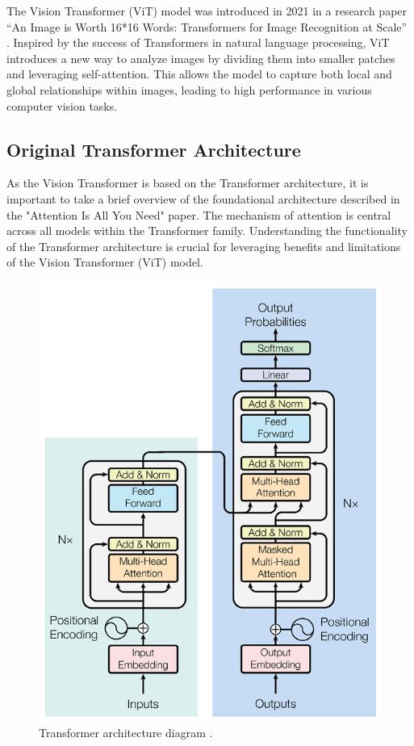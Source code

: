 The Vision Transformer (ViT) model was introduced in 2021 in a research paper “An Image is Worth 16*16 Words: Transformers for Image Recognition at Scale” \cite{dosovitskiy2021imageworth16x16words}. Inspired by the success of Transformers in natural language processing, ViT introduces a new way to analyze images by dividing them into smaller patches and leveraging self-attention. This allows the model to capture both local and global relationships within images, leading to high performance in various computer vision tasks.

\subsection*{Original Transformer Architecture}

As the Vision Transformer is based on the Transformer architecture, it is important to take a brief overview of the foundational architecture described in the "Attention Is All You Need" \cite{vaswani2023attentionneed} paper. The mechanism of attention is central across all models within the Transformer family. Understanding the functionality of the Transformer architecture is crucial for leveraging benefits and limitations of the Vision Transformer (ViT) model.

\begin{figure}[htbp]
    \centering
    \includegraphics[width=0.55\linewidth]{obrazky-figures/02-theoretical-basis/transformer-architecture.png}
    \caption{Transformer architecture diagram \cite{vaswani2023attentionneed}.}
    \label{fig:transformer_architecture}
\end{figure}


